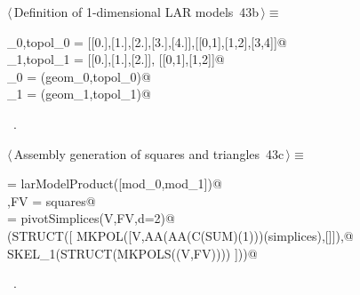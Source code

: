 \documentclass[11pt,oneside]{article}	%
\begin{document}
\begin{flushleft} \small \label{scrap93}
\protect{}$\langle\,$Definition of 1-dimensional LAR models\nobreak\ {\footnotesize 43b}$\,\rangle\equiv$
\vspace{-1ex}
\begin{list}{}{} \item
\mbox{}\verb@geom_0,topol_0 = [[0.],[1.],[2.],[3.],[4.]],[[0,1],[1,2],[3,4]]@\\
\mbox{}\verb@geom_1,topol_1 = [[0.],[1.],[2.]], [[0,1],[1,2]]@\\
\mbox{}\verb@mod_0 = (geom_0,topol_0)@\\
\mbox{}\verb@mod_1 = (geom_1,topol_1)@\\
\mbox{}\verb@@{\NWsep}
\end{list}
\vspace{-1ex}
\footnotesize\addtolength{\baselineskip}{-1ex}
\begin{list}{}{\setlength{\itemsep}{-\parsep}\setlength{\itemindent}{-\leftmargin}}
\item \NWtxtMacroRefIn\ .
\end{list}
\end{flushleft}

\begin{flushleft} \small \label{scrap94}
\protect{}$\langle\,$Assembly generation of squares and triangles\nobreak\ {\footnotesize 43c}$\,\rangle\equiv$
\vspace{-1ex}
\begin{list}{}{} \item
\mbox{}\verb@squares = larModelProduct([mod_0,mod_1])@\\
\mbox{}\verb@V,FV = squares@\\
\mbox{}\verb@simplices = pivotSimplices(V,FV,d=2)@\\
\mbox{}\verb@VIEW(STRUCT([ MKPOL([V,AA(AA(C(SUM)(1)))(simplices),[]]),@\\
\mbox{}\verb@           SKEL_1(STRUCT(MKPOLS((V,FV)))) ]))@\\
\mbox{}\verb@@{\NWsep}
\end{list}
\vspace{-1ex}
\footnotesize\addtolength{\baselineskip}{-1ex}
\begin{list}{}{\setlength{\itemsep}{-\parsep}\setlength{\itemindent}{-\leftmargin}}
\item \NWtxtMacroRefIn\ .
\end{list}
\end{flushleft}
\end{document}
